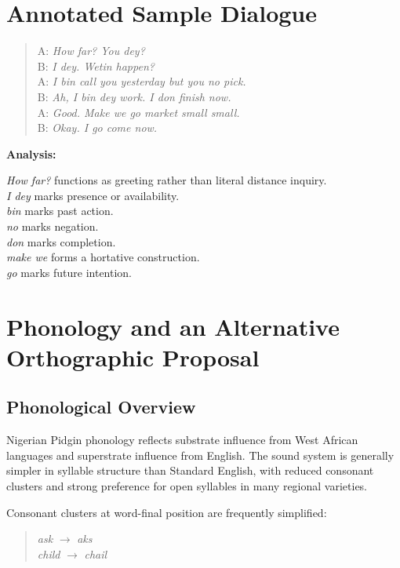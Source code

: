 \documentclass[12pt]{article}
\begin{document}
\section{Annotated Sample Dialogue}

\begin{quote}
A: \textit{How far? You dey?} \\
B: \textit{I dey. Wetin happen?} \\
A: \textit{I bin call you yesterday but you no pick.} \\
B: \textit{Ah, I bin dey work. I don finish now.} \\
A: \textit{Good. Make we go market small small.} \\
B: \textit{Okay. I go come now.}
\end{quote}

\textbf{Analysis:}

\textit{How far?} functions as greeting rather than literal distance inquiry. \\
\textit{I dey} marks presence or availability. \\
\textit{bin} marks past action. \\
\textit{no} marks negation. \\
\textit{don} marks completion. \\
\textit{make we} forms a hortative construction. \\
\textit{go} marks future intention.

\section{Phonology and an Alternative Orthographic Proposal}

\subsection{Phonological Overview}

Nigerian Pidgin phonology reflects substrate influence from West African languages and superstrate influence from English. The sound system is generally simpler in syllable structure than Standard English, with reduced consonant clusters and strong preference for open syllables in many regional varieties.

Consonant clusters at word-final position are frequently simplified:

\begin{quote}
\textit{ask} $\rightarrow$ \textit{aks} \\
\textit{child} $\rightarrow$ \textit{chail}
\end{quote}
\end{document}

